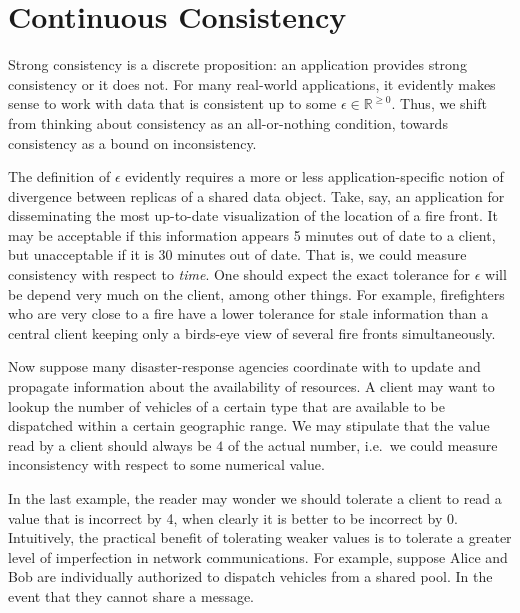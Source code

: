 \documentclass[]             %
{NASA}                       %
\theoremstyle{definition}
\begin{document}
\newpage

\hypertarget{continuous-consistency}{%
\section{Continuous Consistency}\label{continuous-consistency}}

\label{sec:continuous-consistency}

Strong consistency is a discrete proposition: an application provides
strong consistency or it does not. For many real-world applications, it
evidently makes sense to work with data that is consistent up to some
\(\epsilon \in \mathbb{R}^{\geq 0}\). Thus, we shift from thinking about
consistency as an all-or-nothing condition, towards consistency as a
bound on inconsistency.

The definition of \(\epsilon\) evidently requires a more or less
application-specific notion of divergence between replicas of a shared
data object. Take, say, an application for disseminating the most
up-to-date visualization of the location of a fire front. It may be
acceptable if this information appears 5 minutes out of date to a
client, but unacceptable if it is 30 minutes out of date. That is, we
could measure consistency with respect to \emph{time}. One should expect
the exact tolerance for \(\epsilon\) will be depend very much on the
client, among other things. For example, firefighters who are very close
to a fire have a lower tolerance for stale information than a central
client keeping only a birds-eye view of several fire fronts
simultaneously.

Now suppose many disaster-response agencies coordinate with to update
and propagate information about the availability of resources. A client
may want to lookup the number of vehicles of a certain type that are
available to be dispatched within a certain geographic range. We may
stipulate that the value read by a client should always be \(4\) of the
actual number, i.e.~we could measure inconsistency with respect to some
numerical value.

In the last example, the reader may wonder we should tolerate a client
to read a value that is incorrect by 4, when clearly it is better to be
incorrect by 0. Intuitively, the practical benefit of tolerating weaker
values is to tolerate a greater level of imperfection in network
communications. For example, suppose Alice and Bob are individually
authorized to dispatch vehicles from a shared pool. In the event that
they cannot share a message.
\end{document}
